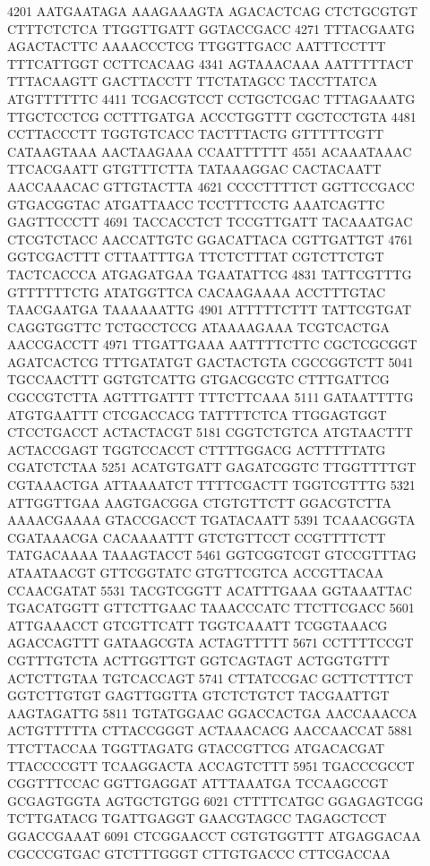 \begin{addmargin}{0.025\textwidth}
\begin{footnotesize}
\begin{LVerbatim}[commandchars=\\\{\}]
\color{red}4201 AATGAATAGA AAAGAAAGTA AGACACTCAG CTCTGCGTGT CTTTCTCTCA TTGGTTGATT GGTACCGACC
\color{red}4271 TTTACGAATG AGACTACTTC AAAACCCTCG TTGGTTGACC AATTTCCTTT TTTCATTGGT CCTTCACAAG
\color{red}4341 AGTAAACAAA AATTTTTACT TTTACAAGTT GACTTACCTT TTCTATAGCC TACCTTATCA ATGTTTTTTC
\color{red}4411 TCGACGTCCT CCTGCTCGAC TTTAGAAATG TTGCTCCTCG CCTTTGATGA ACCCTGGTTT CGCTCCTGTA
\color{red}4481 CCTTACCCTT TGGTGTCACC TACTTTACTG GTTTTTCGTT CATAAGTAAA AACTAAGAAA CCAATTTTTT
\color{red}4551 ACAAATAAAC TTCACGAATT GTGTTTCTTA TATAAAGGAC CACTACAATT AACCAAACAC GTTGTACTTA
\color{red}4621 CCCCTTTTCT GGTTCCGACC GTGACGGTAC ATGATTAACC TCCTTTCCTG AAATCAGTTC GAGTTCCCTT
\color{red}4691 TACCACCTCT TCCGTTGATT TACAAATGAC CTCGTCTACC AACCATTGTC GGACATTACA CGTTGATTGT
\color{red}4761 GGTCGACTTT CTTAATTTGA TTCTCTTTAT CGTCTTCTGT TACTCACCCA ATGAGATGAA TGAATATTCG
\color{red}4831 TATTCGTTTG GTTTTTTCTG ATATGGTTCA CACAAGAAAA ACCTTTGTAC TAACGAATGA TAAAAAATTG
\color{red}4901 ATTTTTCTTT TATTCGTGAT CAGGTGGTTC TCTGCCTCCG ATAAAAGAAA TCGTCACTGA AACCGACCTT
\color{red}4971 TTGATTGAAA AATTTTCTTC CGCTCGCGGT AGATCACTCG TTTGATATGT GACTACTGTA CGCCGGTCTT
\color{red}5041 TGCCAACTTT GGTGTCATTG GTGACGCGTC CTTTGATTCG CGCCGTCTTA AGTTTGATTT TTTCTTCAAA
\color{red}5111 GATAATTTTG ATGTGAATTT CTCGACCACG TATTTTCTCA TTGGAGTGGT CTCCTGACCT ACTACTACGT
\color{red}5181 CGGTCTGTCA ATGTAACTTT ACTACCGAGT TGGTCCACCT CTTTTGGACG ACTTTTTATG CGATCTCTAA
\color{red}5251 ACATGTGATT GAGATCGGTC TTGGTTTTGT CGTAAACTGA ATTAAAATCT TTTTCGACTT TGGTCGTTTG
\color{red}5321 ATTGGTTGAA AAGTGACGGA CTGTGTTCTT GGACGTCTTA AAAACGAAAA GTACCGACCT TGATACAATT
\color{red}5391 TCAAACGGTA CGATAAACGA CACAAAATTT GTCTGTTCCT CCGTTTTCTT TATGACAAAA TAAAGTACCT
\color{red}5461 GGTCGGTCGT GTCCGTTTAG ATAATAACGT GTTCGGTATC GTGTTCGTCA ACCGTTACAA CCAACGATAT
\color{red}5531 TACGTCGGTT ACATTTGAAA GGTAAATTAC TGACATGGTT GTTCTTGAAC TAAACCCATC TTCTTCGACC
\color{red}5601 ATTGAAACCT GTCGTTCATT TGGTCAAATT TCGGTAAACG AGACCAGTTT GATAAGCGTA ACTAGTTTTT
\color{red}5671 CCTTTTCCGT CGTTTGTCTA ACTTGGTTGT GGTCAGTAGT ACTGGTGTTT ACTCTTGTAA TGTCACCAGT
\color{red}5741 CTTATCCGAC GCTTCTTTCT GGTCTTGTGT GAGTTGGTTA GTCTCTGTCT TACGAATTGT AAGTAGATTG
\color{red}5811 TGTATGGAAC GGACCACTGA AACCAAACCA ACTGTTTTTA CTTACCGGGT ACTAAACACG AACCAACCAT
\color{red}5881 TTCTTACCAA TGGTTAGATG GTACCGTTCG ATGACACGAT TTACCCCGTT TCAAGGACTA ACCAGTCTTT
\color{red}5951 TGACCCGCCT CGGTTTCCAC GGTTGAGGAT ATTTAAATGA TCCAAGCCGT GCGAGTGGTA AGTGCTGTGG
\color{red}6021 CTTTTCATGC GGAGAGTCGG TCTTGATACG TGATTGAGGT GAACGTAGCC TAGAGCTCCT GGACCGAAAT
\color{red}6091 CTCGGAACCT CGTGTGGTTT ATGAGGACAA CGCCCGTGAC GTCTTTGGGT CTTGTGACCC CTTCGACCAA

\end{LVerbatim}
\end{footnotesize}
\end{addmargin}
